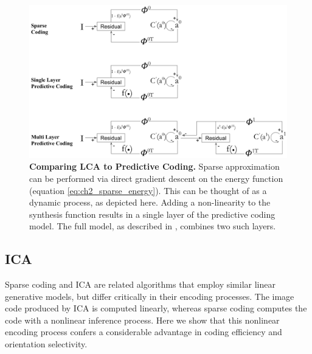 \begin{figure}[h]\label{fig:ch2_lca_pc_comp}
\centering
    \includegraphics[width=\textwidth]{./figures/lca_pc_model_comparisons.png}
    \caption{\textbf{Comparing LCA to Predictive Coding.} Sparse approximation can be performed via direct gradient descent on the energy function (equation \ref{eq:ch2_sparse_energy}). This can be thought of as a dynamic process, as depicted here. Adding a non-linearity to the synthesis function results in a single layer of the predictive coding model. The full model, as described in \parencite{rao1999predictive}, combines two such layers.}
\end{figure}




\subsection{ICA}
Sparse coding and ICA are related algorithms that employ similar linear generative models, but differ critically in their encoding processes. The image code produced by ICA is computed linearly, whereas sparse coding computes the code with a nonlinear inference process. Here we show that this nonlinear encoding process confers a considerable advantage in coding efficiency and orientation selectivity.

